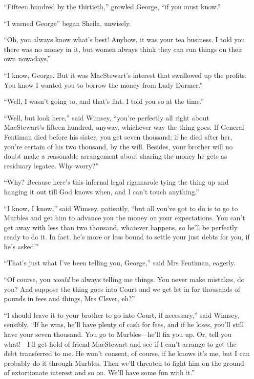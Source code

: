 \enquote{Fifteen hundred by the thirtieth,} growled George, \enquote{if you must know.}

\enquote{I warned George\longdash} began Sheila, unwisely.

\enquote{Oh, you always know what's best! Anyhow, it was your tea business. I told you there was no money in it, but women always think they can run things on their own nowadays.}

\enquote{I know, George. But it was MacStewart's interest that swallowed up the profits. You know I wanted you to borrow the money from Lady Dormer.}

\enquote{Well, I wasn't going to, and that's flat. I told you so at the time.}

\enquote{Well, but look here,} said Wimsey, \enquote{you're perfectly all right about MacStewart's fifteen hundred, anyway, whichever way the thing goes. If General Fentiman died before his sister, you get seven thousand; if he died after her, you're certain of his two thousand, by the will. Besides, your brother will no doubt make a reasonable arrangement about sharing the money he gets as residuary legatee. Why worry?}

\enquote{Why? Because here's this infernal legal rigamarole tying the thing up and hanging it out till God knows when, and I can't touch anything.}

\enquote{I know, I know,} said Wimsey, patiently, \enquote{but all you've got to do is to go to Murbles and get him to advance you the money on your expectations. You can't get away with less than two thousand, whatever happens, so he'll be perfectly ready to do it. In fact, he's more or less bound to settle your just debts for you, if he's asked.}

\enquote{That's just what I've been telling you, George,} said Mrs Fentiman, eagerly.

\enquote{Of course, you \textit{would} be always telling me things. You never make mistakes, do you? And suppose the thing goes into Court and we get let in for thousands of pounds in fees and things, Mrs Clever, eh?}

\enquote{I should leave it to your brother to go into Court, if necessary,} said Wimsey, sensibly. \enquote{If he wins, he'll have plenty of cash for fees, and if he loses, you'll still have your seven thousand. You go to Murbles\allowbreak---\allowbreak he'll fix you up. Or, tell you what!---I'll get hold of friend MacStewart and see if I can't arrange to get the debt transferred to me. He won't consent, of course, if he knows it's me, but I can probably do it through Murbles. Then we'll threaten to fight him on the ground of extortionate interest and so on. We'll have some fun with it.}

